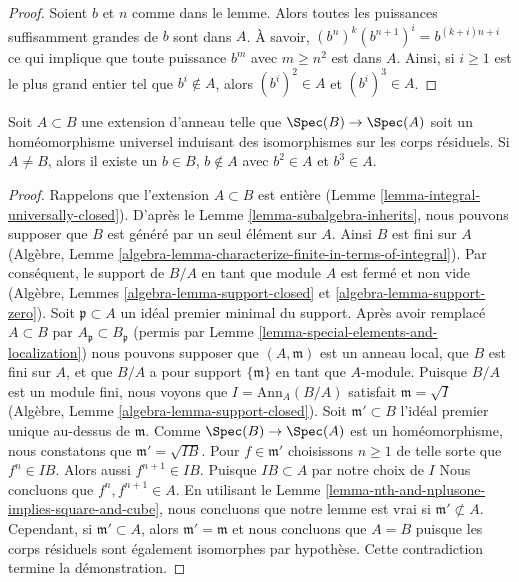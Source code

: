 \begin{proof}
Soient $b$ et $n$ comme dans
le lemme. Alors toutes les puissances suffisamment grandes
de $b$ sont dans $A$. À savoir, $(b^n)^k(b^{n + 1})^i = b^{(k + i)n + i}$
ce qui implique que toute puissance $b^m$ avec $m \geq n^2$
est dans $A$. Ainsi, si $i \geq 1$ est le plus
grand entier tel que $b^i \not \in A$, alors $(b^i)^2 \in A$ et $(b^i)^3 \in A$.
\end{proof}

\begin{lemma}
\label{lemma-square-and-cube}
Soit $A \subset B$ une extension d'anneau telle que $\Spec(B) \to \Spec(A)$ soit un homéomorphisme
universel induisant des isomorphismes sur les corps résiduels.
Si $A \not = B$, alors il existe un $b \in B$, $b \not \in A$ avec
$b^2 \in A$ et $b^3 \in A$.
\end{lemma}

\begin{proof}
Rappelons que l'extension $A \subset B$ est entière
(Lemme \ref{lemma-integral-universally-closed}). D'après le Lemme
\ref{lemma-subalgebra-inherits}, nous pouvons supposer
que $B$ est généré par un seul élément
sur $A$. Ainsi $B$
est fini sur $A$ (Algèbre, Lemme \ref{algebra-lemma-characterize-finite-in-terms-of-integral}). Par
conséquent, le support de $B/A$
en tant que module $A$
est fermé et non vide (Algèbre, Lemmes \ref{algebra-lemma-support-closed} et \ref{algebra-lemma-support-zero}).
Soit $\mathfrak p \subset A$ un idéal premier
minimal du support. Après avoir remplacé
$A \subset B$ par $A_\mathfrak p \subset B_\mathfrak p$ (permis par
Lemme \ref{lemma-special-elements-and-localization}) nous pouvons supposer que $(A, \mathfrak m)$
est un anneau local, que $B$ est fini
sur $A$, et que $B/A$ a pour support $\{\mathfrak m\}$ en
tant que $A$-module. Puisque $B/A$
est un module fini, nous voyons que $I = \text{Ann}_A(B/A)$ satisfait $\mathfrak m = \sqrt{I}$
(Algèbre, Lemme \ref{algebra-lemma-support-closed}). Soit $\mathfrak m' \subset B$
l'idéal premier unique au-dessus de $\mathfrak m$. Comme
$\Spec(B) \to \Spec(A)$ est un homéomorphisme, nous constatons que $\mathfrak m' = \sqrt{IB}$.
Pour $f \in \mathfrak m'$ choisissons
$n \geq 1$ de telle sorte que $f^n \in IB$. Alors
aussi $f^{n + 1} \in IB$. Puisque $IB \subset A$
par notre choix de $I$ Nous concluons que
$f^n, f^{n + 1} \in A$. En utilisant
le Lemme \ref{lemma-nth-and-nplusone-implies-square-and-cube}, nous concluons que notre lemme
est vrai si $\mathfrak m' \not \subset A$. Cependant, si $\mathfrak m' \subset A$,
alors $\mathfrak m' = \mathfrak m$ et nous concluons que $A = B$ puisque les
corps résiduels sont également isomorphes
par hypothèse. Cette contradiction termine la
démonstration.
\end{proof}

